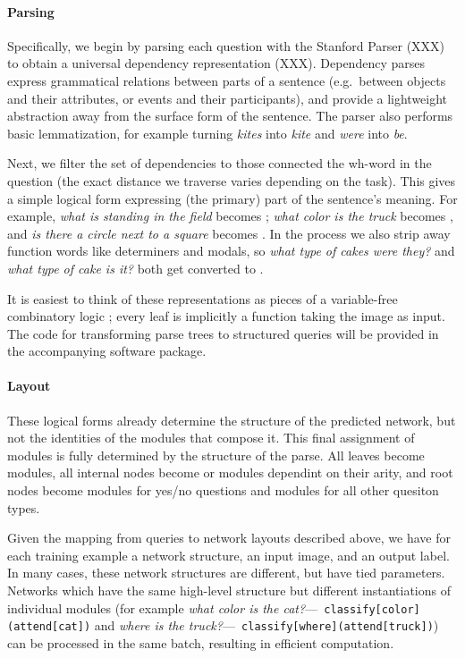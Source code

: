 \paragraph{Parsing}
Specifically, we begin by parsing each question with the Stanford Parser (XXX)
to obtain a universal dependency representation (XXX). Dependency parses express
grammatical relations between parts of a sentence (e.g.\ between objects and
their attributes, or events and their participants), and provide a lightweight
abstraction away from the surface form of the sentence. The parser also performs
basic lemmatization, for example turning \emph{kites} into \emph{kite} and
\emph{were} into \emph{be}. 

Next, we filter the set of dependencies to those connected the wh-word in the
question (the exact distance we traverse varies depending on the task). This
gives a simple logical form expressing (the primary) part of the sentence's
meaning.  For example, \emph{what is standing in the field} becomes
; \emph{what color is the truck} becomes ,
and \emph{is there a circle next to a square} becomes .
In the process we also strip away function words like determiners and
modals, so \emph{what type of cakes were they?} and \emph{what type of cake is
it?} both get converted to .

It is easiest to think of these representations as pieces of a variable-free
combinatory logic \cite{Liang13DCS}; every leaf is implicitly a function taking
the image as input. The code for transforming parse trees to structured queries
will be provided in the accompanying software package.

\paragraph{Layout}
These logical forms already determine the structure of the predicted network,
but not the identities of the modules that compose it. This final assignment of
modules is fully determined by the structure of the parse. All leaves become
 modules, all internal nodes become  or 
modules dependint on their arity, and root nodes become  modules
for yes/no questions and  modules for all other quesiton types.

Given the mapping from queries to network layouts described above, we have for
each training example a network structure, an input image, and an output label.
In many cases, these network structures are different, but have tied parameters.
Networks which have the same high-level structure but different instantiations
of individual modules (for example \emph{what color is the cat?}---{\small\tt
classify[color](attend[cat])} and \emph{where is the truck?}---{\small\tt
classify[where](attend[truck])}) can be processed in the same batch, resulting
in efficient computation.

